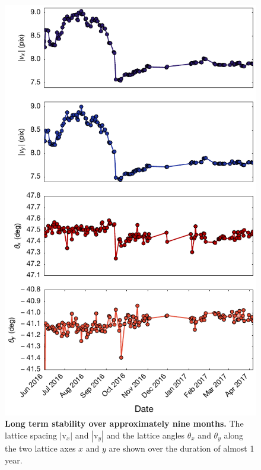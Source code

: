 \documentclass[twocolumn,aps,pra,showpacs,preprintnumbers,bibnotes]{revtex4-1}
\begin{document}
\begin{figure}
\begin{center}
    \includegraphics[width=\columnwidth]{Figure14.pdf}
    \caption{\textbf{Long term stability over approximately nine months.} The lattice spacing $|\mathrm{v}_x|$ and $|\mathrm{v}_y|$ and the lattice angles $\theta_x$ and $\theta_y$ along the two lattice axes $x$ and $y$ are shown over the duration of almost 1 year. }\label{fig:long_term_stability}
  \end{center}
\end{figure}
\end{document}
